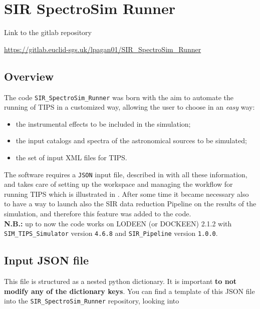 \section{SIR SpectroSim Runner}\label{sec:sir_runner}

Link to the gitlab repository

\begin{center}
\hypertarget{url:sir_runner_gitlab}{\url{https://gitlab.euclid-sgs.uk/lpagan01/SIR_SpectroSim_Runner}}
\end{center}

\subsection{Overview}

The code \verb+SIR_SpectroSim_Runner+ was born with the aim to automate the running of TIPS in a customized way, allowing the user to choose in an \emph{easy} way:

\begin{itemize}
\item the instrumental effects to be included in the simulation;
\item the input catalogs and spectra of the astronomical sources to be simulated;
\item the set of input XML files for TIPS.
\end{itemize}

The software requires a \verb+JSON+ input file, described in  with all these information, and takes care of setting up the workspace and managing the workflow for running TIPS which is illustrated in . After some time it became necessary also to have a way to launch also the SIR data reduction Pipeline on the results of the simulation, and therefore this feature was added to the code.\\
\textbf{N.B.:} up to now the code works on LODEEN (or DOCKEEN) 2.1.2 with \verb+SIM_TIPS_Simulator+ version \verb+4.6.8+ and \verb+SIR_Pipeline+ version \verb+1.0.0+.

\subsection{Input JSON file}\label{subsec:input_JSON}
This file is structured as a nested python dictionary. It is important \textbf{to not modify any of the dictionary keys}. You can find a template of this JSON file into the \verb+SIR_SpectroSim_Runner+ repository, looking into

